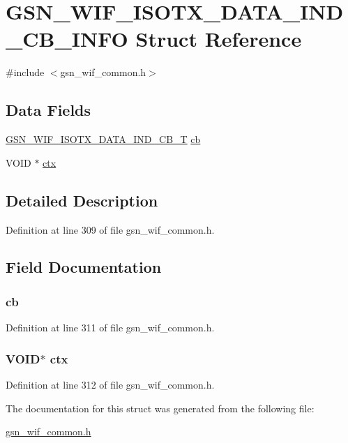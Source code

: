 \hypertarget{a00340}{
\section{GSN\_\-WIF\_\-ISOTX\_\-DATA\_\-IND\_\-CB\_\-INFO Struct Reference}
\label{a00340}
}


{\ttfamily \#include $<$gsn\_\-wif\_\-common.h$>$}

\subsection*{Data Fields}
\begin{DoxyCompactItemize}
\item 
\hyperlink{a00635_ga9630fce1058035404e218cc275052c03}{GSN\_\-WIF\_\-ISOTX\_\-DATA\_\-IND\_\-CB\_\-T} \hyperlink{a00340_a56020643ef8fbcdd3997fca14227b342}{cb}
\item 
VOID $\ast$ \hyperlink{a00340_add401254b29adaa41706c97d1c8d3e89}{ctx}
\end{DoxyCompactItemize}


\subsection{Detailed Description}


Definition at line 309 of file gsn\_\-wif\_\-common.h.



\subsection{Field Documentation}
\hypertarget{a00340_a56020643ef8fbcdd3997fca14227b342}{
\subsubsection[{cb}]{ {\bf cb}}}
\label{a00340_a56020643ef8fbcdd3997fca14227b342}


Definition at line 311 of file gsn\_\-wif\_\-common.h.

\hypertarget{a00340_add401254b29adaa41706c97d1c8d3e89}{
\subsubsection[{ctx}]{\setlength{\rightskip}{0pt plus 5cm}VOID$\ast$ {\bf ctx}}}
\label{a00340_add401254b29adaa41706c97d1c8d3e89}


Definition at line 312 of file gsn\_\-wif\_\-common.h.



The documentation for this struct was generated from the following file:\begin{DoxyCompactItemize}
\item 
\hyperlink{a00608}{gsn\_\-wif\_\-common.h}\end{DoxyCompactItemize}
